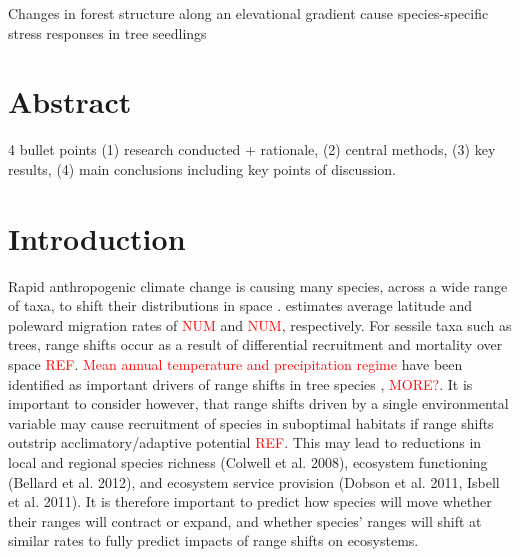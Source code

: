 \documentclass[a4paper,11pt]{article}
\newcommand{\todo}[1]{\textcolor{red}{#1}}   %
\begin{document}
\setlength{\parskip}{10pt}   %
\setlength{\headsep}{30pt} %
\setlength{\parindent}{0pt} %
%
%
%
\raggedright %
\begin{center}{\LARGE{Changes in forest structure along an elevational gradient cause species-specific stress responses in tree seedlings}}\end{center}  %

\section*{Abstract}
4 bullet points (1) research conducted + rationale, (2) central methods, (3) key results, (4) main conclusions including key points of discussion. 

\section*{Introduction}
Rapid anthropogenic climate change is causing many species, across a wide range of taxa, to shift their distributions in space \citep{Hughes2000, Parmesan2006, Chen2011}. \citet{Chen2011} estimates average latitude and poleward migration rates of \todo{NUM} and \todo{NUM}, respectively. For sessile taxa such as trees, range shifts occur as a result of differential recruitment and mortality over space \todo{REF}. \todo{Mean annual temperature and precipitation regime} have been identified as important drivers of range shifts in tree species \citep{Colwell2008, Chen2011, Feeley2012}, \todo{MORE?}. It is important to consider however, that range shifts driven by a single environmental variable may cause recruitment of species in suboptimal habitats if range shifts outstrip acclimatory/adaptive potential \todo{REF}. This may lead to reductions in local and regional species richness (Colwell et al. 2008), ecosystem functioning (Bellard et al. 2012), and ecosystem service provision (Dobson et al. 2011, Isbell et al. 2011). It is therefore important to predict how species will move whether their ranges will contract or expand, and whether species' ranges will shift at similar rates to fully predict impacts of range shifts on ecosystems.
\end{document}
